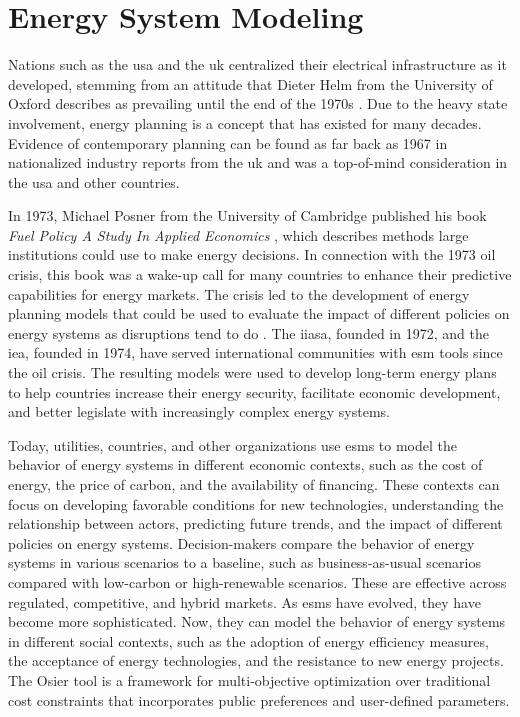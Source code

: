 \section{Energy System Modeling}
\label{sec:esm}

Nations such as the \gls{usa} and the \gls{uk} centralized their electrical infrastructure as it developed, stemming from an attitude that Dieter
Helm from the University of Oxford describes as prevailing until the end
of the 1970s \cite{helm_energy_2002}. Due to the heavy state involvement,
energy planning is a concept that has existed for many decades. Evidence of contemporary planning can be found as far back as 1967 in
nationalized industry reports from the \gls{uk}
\cite{treasury_nationalised_1967} and was a top-of-mind consideration in the
\gls{usa} and other countries.

In 1973, Michael Posner from the University of Cambridge published his book
\textit{Fuel Policy A Study In Applied Economics} \cite{posner_fuel_1973},
which describes methods large institutions could use to make
energy decisions. In connection with the 1973 oil crisis, this book was a wake-up call for many countries to enhance their predictive capabilities for energy markets. The crisis led to the development of energy planning models
that could be used to evaluate the impact of different policies on energy
systems as disruptions tend to do \cite{plazas_disrupt_2022}. The \gls{iiasa},
founded in 1972, and the \gls{iea}, founded in 1974, have served international communities with \gls{esm} tools since the oil crisis. The resulting models were used to develop long-term energy plans to help countries increase their energy security, facilitate economic development, and better legislate with increasingly complex energy systems.

Today, utilities, countries, and other organizations use \glspl{esm} to model
the behavior of energy systems in different economic contexts, such as the cost
of energy, the price of carbon, and the availability of financing. These
contexts can focus on developing favorable conditions for new technologies,
understanding the relationship between actors, predicting future trends, and
the impact of different policies on energy systems. Decision-makers compare the
behavior of energy systems in various scenarios to a baseline, such as
business-as-usual scenarios compared with low-carbon or high-renewable
scenarios. These are effective across regulated, competitive, and hybrid
markets. As \glspl{esm} have evolved, they have become more sophisticated. Now,
they can model the behavior of energy systems in different social contexts,
such as the adoption of energy efficiency measures, the acceptance of energy
technologies, and the resistance to new energy projects. The Osier tool
\cite{Dotson_osier} is a framework for multi-objective optimization over traditional cost constraints that incorporates public preferences and user-defined parameters.

